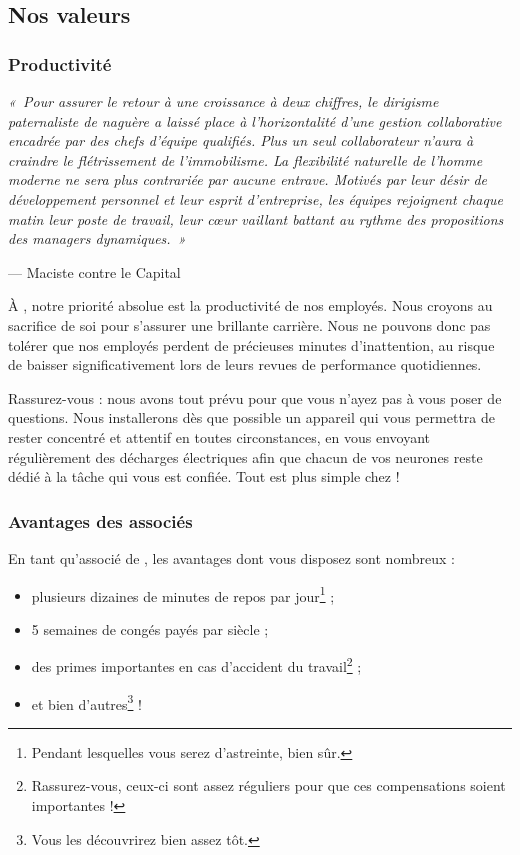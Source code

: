 \subsection{Nos valeurs}

\subsubsection{Productivité}

\emph{« Pour assurer le retour à une croissance à deux chiffres, le dirigisme
paternaliste de naguère a laissé place à l'horizontalité d'une gestion
collaborative encadrée par des chefs d'équipe qualifiés. Plus un seul
collaborateur n'aura à craindre le flétrissement de l'immobilisme. La
flexibilité naturelle de l'homme moderne ne sera plus contrariée par aucune
entrave. Motivés par leur désir de développement personnel et leur esprit
d'entreprise, les équipes rejoignent chaque matin leur poste de travail, leur
cœur vaillant battant au rythme des propositions des managers dynamiques. »}

\vspace{0.3cm}
\hspace{3cm} --- Maciste contre le Capital

À \provogon{}, notre priorité absolue est la productivité de nos employés. Nous
croyons au sacrifice de soi pour s'assurer une brillante carrière. Nous ne
pouvons donc pas tolérer que nos employés perdent de précieuses minutes
d'inattention, au risque de baisser significativement lors de leurs revues de
performance quotidiennes.

Rassurez-vous : nous avons tout prévu pour que vous n'ayez pas à vous poser de
questions. Nous installerons dès que possible un appareil qui vous permettra
de rester concentré et attentif en toutes circonstances, en vous envoyant
régulièrement des décharges électriques afin que chacun de vos neurones reste
dédié à la tâche qui vous est confiée. Tout est plus simple chez \provogon{} !

\subsubsection{Avantages des associés}

En tant qu'associé de \provogon{}, les avantages dont vous disposez sont nombreux :

\begin{itemize}
    \item plusieurs dizaines de minutes de repos par jour\footnote{Pendant
        lesquelles vous serez d'astreinte, bien sûr.} ;
    \item 5 semaines de congés payés par siècle ;
    \item des primes importantes en cas d'accident du
        travail\footnote{Rassurez-vous, ceux-ci sont assez réguliers pour
        que ces compensations soient importantes !} ;
    \item et bien d'autres\footnote{Vous les découvrirez bien assez tôt.} !
\end{itemize}

